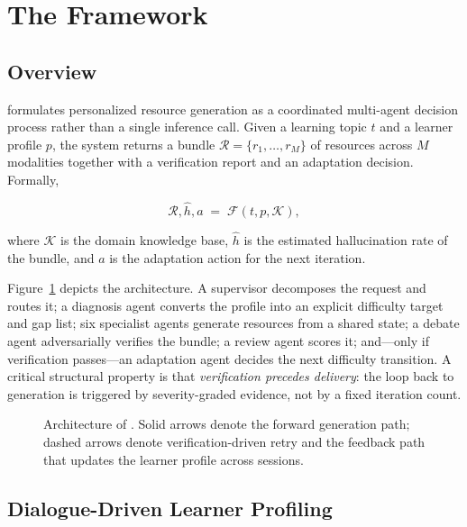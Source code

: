 \section{The \sysname{} Framework}
\label{sec:method}

\subsection{Overview}
\label{ssec:overview}

\sysname{} formulates personalized resource generation as a coordinated
multi-agent decision process rather than a single inference call. Given a
learning topic $t$ and a learner profile $p$, the system returns a bundle
$\mathcal{R} = \{r_1,\ldots,r_M\}$ of resources across $M$ modalities together
with a verification report and an adaptation decision. Formally,

\begin{equation}
\mathcal{R}, \hat{h}, a \;=\; \mathcal{F}(t, p, \mathcal{K}),
\end{equation}

where $\mathcal{K}$ is the domain knowledge base, $\hat{h}$ is the estimated
hallucination rate of the bundle, and $a$ is the adaptation action for the next
iteration.

Figure~\ref{fig:arch} depicts the architecture. A supervisor decomposes the
request and routes it; a diagnosis agent converts the profile into an explicit
difficulty target and gap list; six specialist agents generate resources from a
shared state; a debate agent adversarially verifies the bundle; a review agent
scores it; and---only if verification passes---an adaptation agent decides the
next difficulty transition. A critical structural property is that
\emph{verification precedes delivery}: the loop back to generation is triggered
by severity-graded evidence, not by a fixed iteration count.

\begin{figure}[!t]
\centering

\caption{Architecture of \sysname{}. Solid arrows denote the forward
generation path; dashed arrows denote verification-driven retry and the
feedback path that updates the learner profile across sessions.}
\label{fig:arch}
\end{figure}

\subsection{Dialogue-Driven Learner Profiling}
\label{ssec:profile}

